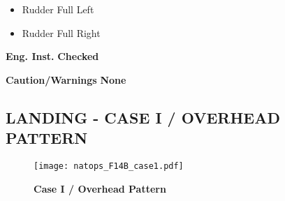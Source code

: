 \documentclass[fontSpartan]{TechCheck}
\begin{document}
\begin{tablenumerate}
{\begin{subenumerate}
\begin{itemize}
				\item Rudder Full Left
				\item Rudder Full Right
			\end{itemize}
			\item \textbf{Eng. Inst.} \dotfill \textbf{Checked}
			\item \textbf{Caution/Warnings}  \dotfill\textbf{None}
		\end{subenumerate}}
	\end{tablenumerate}

	\clearpage

	\subsection{LANDING -  CASE I / OVERHEAD PATTERN}
	\begin{figure}[h]
		\centering
		\texttt{[image: natops\_F14B\_case1.pdf]}
		\caption{\textbf{Case I / Overhead Pattern}}
		\label{fig:case1}
	\end{figure}
\end{document}

